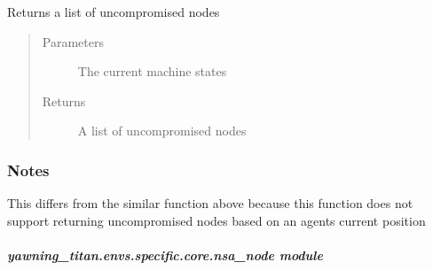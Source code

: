 \documentclass[letterpaper,10pt,english]{sphinxmanual}
\begin{document}
\begin{fulllineitems}
\label{\detokenize{source/yawning_titan.envs.specific.core:yawning_titan.envs.specific.core.node_states.get_uncompromised_nodes}}
\sphinxAtStartPar
Returns a list of uncompromised nodes
\begin{quote}\begin{description}
\item[{Parameters}] \leavevmode
\sphinxAtStartPar
{} \textendash{} The current machine states

\item[{Returns}] \leavevmode
\sphinxAtStartPar
A list of uncompromised nodes

\end{description}\end{quote}
\subsubsection*{Notes}

\sphinxAtStartPar
This differs from the similar function above
because this function does not support returning
uncompromised nodes based on an agents current
position

\end{fulllineitems}



\subparagraph{yawning\_titan.envs.specific.core.nsa\_node module}
\label{\detokenize{source/yawning_titan.envs.specific.core:module-yawning_titan.envs.specific.core.nsa_node}}\label{\detokenize{source/yawning_titan.envs.specific.core:yawning-titan-envs-specific-core-nsa-node-module}}
\end{document}
